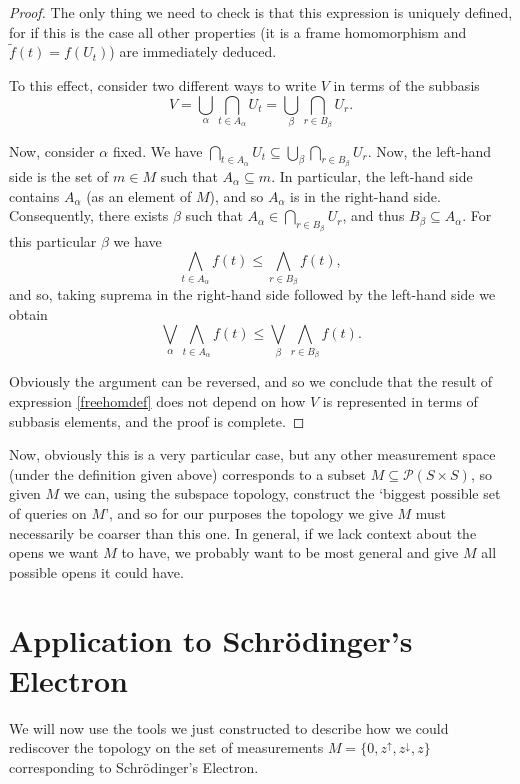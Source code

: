 \documentclass{article}
\theoremstyle{definition}
\theoremstyle{plain}
\newcommand{\ps}{\mathcal{P}}
\begin{document}
\begin{proof}
The only thing we need to check is that this expression is uniquely defined, for if this is the case all other properties (it is a frame homomorphism and $\tilde f(t) = f(U_t)$) are immediately deduced.

To this effect, consider two different ways to write $V$ in terms of the subbasis
\[V = \bigcup_\alpha \bigcap_{t \in A_\alpha} U_t = \bigcup_\beta \bigcap_{r \in B_\beta} U_r.\]

Now, consider $\alpha$ fixed. We have $\bigcap_{t \in A_\alpha} U_t \subseteq \bigcup_\beta \bigcap_{r \in B_\beta} U_r$. Now, the left-hand side is the set of $m \in M$ such that $A_\alpha \subseteq m$. In particular, the left-hand side contains $A_\alpha$ (as an element of $M$), and so $A_\alpha$ is in the right-hand side. Consequently, there exists $\beta$ such that $A_\alpha \in \bigcap_{r \in B_\beta} U_r$, and thus $B_\beta \subseteq A_\alpha$. For this particular $\beta$ we have
\[\bigwedge_{t \in A_\alpha} f(t) \leq \bigwedge_{r \in B_\beta} f(t),\]
and so, taking suprema in the right-hand side followed by the left-hand side we obtain
\[\bigvee_\alpha \bigwedge_{t \in A_\alpha} f(t) \leq \bigvee_\beta \bigwedge_{r \in B_\beta} f(t).\]

Obviously the argument can be reversed, and so we conclude that the result of expression \eqref{freehomdef} does not depend on how $V$ is represented in terms of subbasis elements, and the proof is complete.
\end{proof}

Now, obviously this is a very particular case, but any other measurement space (under the definition given above) corresponds to a subset $M \subseteq \ps(S \times S)$, so given $M$ we can, using the subspace topology, construct the `biggest possible set of queries on $M$', and so for our purposes the topology we give $M$ must necessarily be coarser than this one. In general, if we lack context about the opens we want $M$ to have, we probably want to be most general and give $M$ all possible opens it could have.

\section{Application to Schrödinger's Electron}

We will now use the tools we just constructed to describe how we could rediscover the topology on the set of measurements $M = \{0,z^\uparrow,z^\downarrow,z\}$ corresponding to Schrödinger's Electron.
\end{document}
